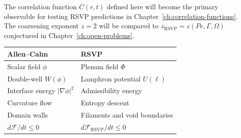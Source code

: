 \begin{ForwardRef}
  The correlation function $C(r,t)$ defined here will become
  the primary observable for testing RSVP predictions in
  Chapter~\ref{ch:correlation-functions}.
  The coarsening exponent $z = 2$ will be compared to
  $z_{\mathrm{RSVP}} = z(Pe, \Gamma, \Omega)$ conjectured in
  Chapter~\ref{ch:open-problems}.
\end{ForwardRef}

\begin{CrossDomain}
  \begin{center}
  \begin{tabular}{@{}ll@{}}
    \toprule
    \textbf{Allen--Cahn} & \textbf{RSVP} \\
    \midrule
    Scalar field $\phi$ & Plenum field $\Phi$ \\
    Double-well $W(\phi)$ & Lamphron potential $U(\ell)$ \\
    Interface energy $|\nabla\phi|^2$ & Admissibility energy \\
    Curvature flow & Entropy descent \\
    Domain walls & Filaments and void boundaries \\
    $d\mathcal{F}/dt \leq 0$ & $d\mathcal{F}_{\mathrm{RSVP}}/dt \leq 0$ \\
    \bottomrule
  \end{tabular}
  \end{center}
\end{CrossDomain}

